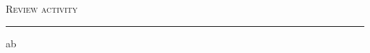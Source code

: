 \documentclass[a4paper,10pt]{article}
\newcommand{\mediumtitle}[1]{
	\vspace{0.2cm}
	{\noindent
	\Large \textsc{#1}\\[-2ex]
	\hrule
	\vspace{0.2cm}}
}
\newenvironment{doubletablelist}
{
	\vspace{-0.2cm}
	\begin{longtable}[!h]{AB}}{\end{longtable}
}
\newcommand{\dtlist}[2]{
\hspace{-3cm}
\noindent
	\begin{minipage}{0.22\textwidth}
	\begin{flushright}
	\textsc{#1}
	\end{flushright}
	\end{minipage}
	& #2\\[0.2cm]
}
\newenvironment{singletablelist}
{	\vspace{-0.2cm}
	\begin{longtable}[!h]{ab}}{\end{longtable}
}
\begin{document}
\newpage













\newpage

\mediumtitle{Review activity}

\begin{singletablelist}


\end{singletablelist}
\end{document}
